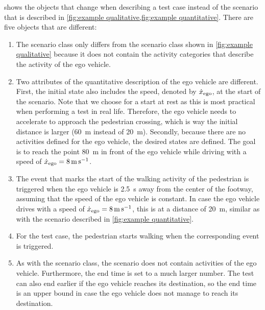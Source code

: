  shows the objects that change when describing a test case instead of the scenario that is described in \cref{fig:example qualitative,fig:example quantitative}. There are five objects that are different:
\begin{enumerate}
	\item The scenario class only differs from the scenario class shown in \cref{fig:example qualitative} because it does not contain the activity categories that describe the activity of the ego vehicle.
	\item Two attributes of the quantitative description of the ego vehicle are different. First, the initial state also includes the speed, denoted by $\dot{x}_{\mathrm{ego}}$, at the start of the scenario. Note that we choose for a start at rest as this is most practical when performing a test in real life. Therefore, the ego vehicle needs to accelerate to approach the pedestrian crossing, which is way the initial distance is larger (\SI{60}{\meter} instead of \SI{20}{\meter}). Secondly, because there are no activities defined for the ego vehicle, the desired states are defined. The goal is to reach the point \SI{80}{\meter} in front of the ego vehicle while driving with a speed of $\dot{x}_{\mathrm{ego}}=\SI{8}{\meter\per\second}$.
	\item The event that marks the start of the walking activity of the pedestrian is triggered when the ego vehicle is \SI{2.5}{\second} away from the center of the footway, assuming that the speed of the ego vehicle is constant. In case the ego vehicle drives with a speed of $\dot{x}_{\mathrm{ego}}=\SI{8}{\meter\per\second}$, this is at a distance of \SI{20}{\meter}, similar as with the scenario described in \cref{fig:example quantitative}.
	\item For the test case, the pedestrian starts walking when the corresponding event is triggered.
	\item As with the scenario class, the scenario does not contain activities of the ego vehicle. Furthermore, the end time is set to a much larger number. The test can also end earlier if the ego vehicle reaches its destination, so the end time is an upper bound in case the ego vehicle does not manage to reach its destination.
\end{enumerate}  

\cbend
